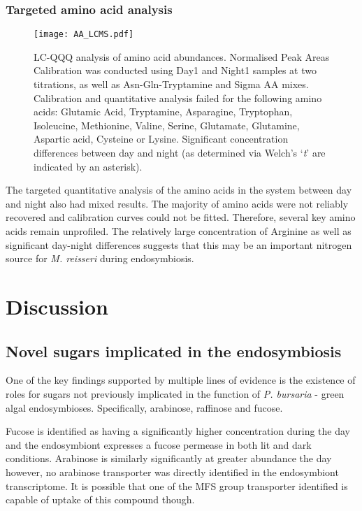 \subsubsection{Targeted amino acid analysis}

\begin{figure}
    \texttt{[image: AA\_LCMS.pdf]}
    \caption[LC-QQQ Quantitative Analysis of Amino Acids]{LC-QQQ analysis
        of amino acid abundances. Normalised Peak Areas 
        Calibration was conducted using Day1 and Night1 samples at two titrations, as well as Asn-Gln-Tryptamine and Sigma AA mixes.
    Calibration and quantitative analysis failed for the following amino acids: 
Glutamic Acid, Tryptamine, Asparagine, Tryptophan, Isoleucine, Methionine, Valine, Serine, Glutamate, Glutamine, Aspartic acid, Cysteine or Lysine.
    Significant concentration differences between day and night (as determined via Welch's `\textit{t}' are indicated by an asterisk).}
    \label{fig:amino_acids}
\end{figure}

The targeted quantitative analysis of the amino acids in the system
between day and night also had mixed results.  The majority of amino
acids were not reliably recovered and calibration curves could not be fitted.
Therefore, several key amino acids remain unprofiled.
The relatively large concentration of Arginine as well as significant
day-night differences suggests that this may be an important nitrogen
source for \textit{M. reisseri} during endosymbiosis.


\section{Discussion}

\subsection{Novel sugars implicated in the endosymbiosis}

One of the key findings supported by multiple lines of evidence
is the existence of roles for sugars not previously implicated in the
function of \textit{P. bursaria} - green algal endosymbioses. 
Specifically, arabinose, raffinose and fucose. 

Fucose is identified as having a significantly higher concentration during the day 
and the endosymbiont expresses a fucose permease in both lit and dark conditions.
Arabinose is similarly significantly at greater abundance the day 
however, no arabinose transporter was directly identified in the endosymbiont 
transcriptome.  It is possible that one of the MFS group transporter identified is 
capable of uptake of this compound though. 

